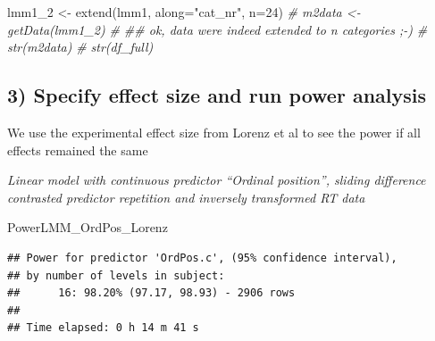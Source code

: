 \documentclass[
]{article}
\newenvironment{Shaded}{\begin{snugshade}}{\end{snugshade}}
\newcommand{\AttributeTok}[1]{\textcolor[rgb]{0.77,0.63,0.00}{#1}}
\newcommand{\CommentTok}[1]{\textcolor[rgb]{0.56,0.35,0.01}{\textit{#1}}}
\newcommand{\DecValTok}[1]{\textcolor[rgb]{0.00,0.00,0.81}{#1}}
\newcommand{\FunctionTok}[1]{\textcolor[rgb]{0.00,0.00,0.00}{#1}}
\newcommand{\NormalTok}[1]{#1}
\newcommand{\OtherTok}[1]{\textcolor[rgb]{0.56,0.35,0.01}{#1}}
\newcommand{\SpecialCharTok}[1]{\textcolor[rgb]{0.00,0.00,0.00}{#1}}
\newcommand{\StringTok}[1]{\textcolor[rgb]{0.31,0.60,0.02}{#1}}
\begin{document}
\begin{Shaded}
\begin{Highlighting}[]
\NormalTok{lmm1\_2 }\OtherTok{\textless{}{-}} \FunctionTok{extend}\NormalTok{(lmm1, }\AttributeTok{along=}\StringTok{"cat\_nr"}\NormalTok{, }\AttributeTok{n=}\DecValTok{24}\NormalTok{)}
\CommentTok{\# m2data \textless{}{-} getData(lmm1\_2) }
\CommentTok{\# \#\# ok, data were indeed extended to n categories ;{-})}
\CommentTok{\# str(m2data)}
\CommentTok{\# str(df\_full)}
\end{Highlighting}
\end{Shaded}

\hypertarget{specify-effect-size-and-run-power-analysis-1}{%
\subsection{3) Specify effect size and run power
analysis}\label{specify-effect-size-and-run-power-analysis-1}}

We use the experimental effect size from Lorenz et al to see the power
if all effects remained the same

\emph{Linear model with continuous predictor ``Ordinal position'',
sliding difference contrasted predictor repetition and inversely
transformed RT data}

\begin{Shaded}
\end{Shaded}

\begin{Shaded}
\begin{Highlighting}[]
\NormalTok{PowerLMM\_OrdPos\_Lorenz}
\end{Highlighting}
\end{Shaded}

\begin{verbatim}
## Power for predictor 'OrdPos.c', (95% confidence interval),
## by number of levels in subject:
##      16: 98.20% (97.17, 98.93) - 2906 rows
## 
## Time elapsed: 0 h 14 m 41 s
\end{verbatim}
\end{document}
